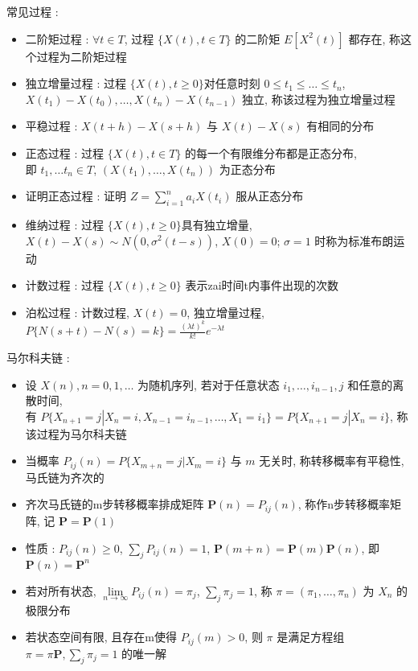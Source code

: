 \documentclass[UTF8, 12pt]{ctexart}
\begin{document}
	常见过程 : 
	\begin{itemize}[leftmargin = 4em]
		\item 二阶矩过程 : $ \forall t \in T $, 过程 $ \{X(t), t \in T\} $ 的二阶矩 $ E[X^{2}(t)] $ 都存在, 称这个过程为二阶矩过程
		\item 独立增量过程 : 过程 $ \{X(t), t \geq 0\} $对任意时刻 $ 0 \leq t_{1} \leq \dots \leq t_{n} $, $ X(t_{1})-X(t_{0}), \dots, X(t_{n})-X(t_{n-1}) $ 独立, 称该过程为独立增量过程
		\item 平稳过程 : $ X(t+h)-X(s+h) $ 与 $ X(t)-X(s) $ 有相同的分布
		\item 正态过程 : 过程 $ \{X(t), t \in T\} $ 的每一个有限维分布都是正态分布, \\
		即 $ t_{1}, \dots t_{n} \in T $, $ (X(t_{1}), \dots, X(t_{n})) $ 为正态分布
		\item 证明正态过程 :  证明 $ Z = \sum\limits_{i=1}^{n}a_{i}X(t_{i}) $ 服从正态分布
		\item 维纳过程 : 过程 $ \{X(t), t \geq 0\} $具有独立增量, $ X(t)-X(s) \sim N(0, \sigma^{2}(t-s)) $, $ X(0) = 0 $; $ \sigma = 1 $ 时称为标准布朗运动
		\item 计数过程 : 过程 $ \{X(t), t \geq 0\} $ 表示zai时间t内事件出现的次数
		\item 泊松过程 : 计数过程, $ X(t)=0 $, 独立增量过程, $ P\{N(s+t)-N(s)=k\} = \frac{(\lambda t)^{k}}{k!}e^{-\lambda t} $
	\end{itemize}

	马尔科夫链 : 
	\begin{itemize}[leftmargin = 4em]
		\item 设 $ X(n), n = 0, 1, \dots $ 为随机序列, 若对于任意状态 $ i_{1}, \dots, i_{n-1}, j $ 和任意的离散时间, \\
		有 $ P\{X_{n+1}=j|X_{n}=i, X_{n-1}=i_{n-1}, \dots, X_{1}=i_{1}\} = P\{X_{n+1}=j|X_{n}=i\} $, 称该过程为马尔科夫链
		\item 当概率 $ P_{ij}(n) = P\{X_{m+n}=j|X_{m}=i\} $ 与 $ m $ 无关时, 称转移概率有平稳性, 马氏链为齐次的
		\item 齐次马氏链的m步转移概率排成矩阵 $ \mathbf{P}(n) = P_{ij}(n) $, 称作n步转移概率矩阵, 记 $ \mathbf{P} = \mathbf{P}(1) $
		\item 性质 : $ P_{ij}(n) \geq 0 $, $ \sum\limits_{j} P_{ij}(n) = 1 $, $ \mathbf{P}(m+n) = \mathbf{P}(m)\mathbf{P}(n) $, 即 $ \mathbf{P}(n) = \mathbf{P}^{n} $
		\item 若对所有状态, $ \lim\limits_{n \to \infty}P_{ij}(n) = \pi_{j} $, $ \sum\limits_{j}\pi_{j} = 1 $, 称 $ \pi = (\pi_{1}, \dots, \pi_{n}) $ 为 $ X_{n} $ 的极限分布
		\item 若状态空间有限, 且存在m使得 $ P_{ij}(m) > 0 $, 则 $ \pi $ 是满足方程组 $ \pi = \pi\mathbf{P}, \sum\limits_{j}\pi_{j} = 1 $ 的唯一解
	\end{itemize}
\end{document}
